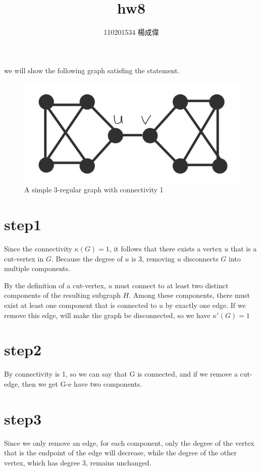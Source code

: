 \documentclass{article}
\title{hw8}
\author{110201534 楊成偉}
\date{}
\begin{document}
\begin{CJK*}{UTF8}{bkai}
\maketitle


we will show the following graph satisfing the statement.
\begin{figure}[H]
    \centering
    \includegraphics[scale = 0.1]{hw8g.jpg}
    \caption{A simple 3-regular graph with connectivity 1}
\end{figure}
\section*{step1}
Since the connectivity \( \kappa(G) = 1 \), it follows that there exists a vertex \( u \) that is a cut-vertex in \( G \). Because the degree of \( u \) is 3, removing \( u \) disconnects \( G \) into multiple components.

By the definition of a cut-vertex, \( u \) must connect to at least two distinct components of the resulting subgraph \( H \). Among these components, there must exist at least one component that is connected to \( u \) by exactly one edge. If we remove this edge, will make the graph be disconnected, so we have $\kappa'(G) = 1$

\section*{step2}
By connectivity is 1, so we can say that G is connected, and if we remove a cut-edge, then we get G-e have two components.
\section*{step3}
Since we only remove an edge, for each component, only the degree of the vertex that is the endpoint of the edge will decrease, while the degree of the other vertex, which has degree 3, remains unchanged.

\end{CJK*}
\end{document}
